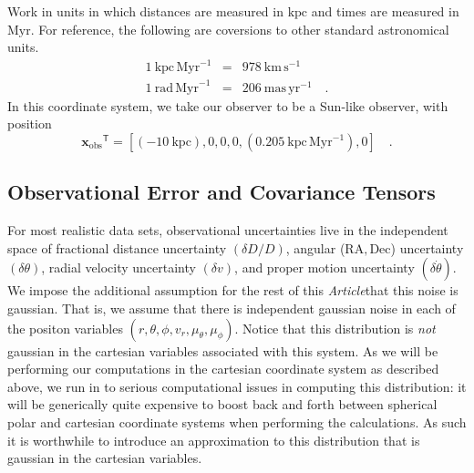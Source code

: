 \documentclass[12pt,preprint]{aastex}
\theoremstyle{plain}
\theoremstyle{definition}
\newcommand{\mtensor}[1]{\boldsymbol{#1}}
\newcommand{\mvector}[1]{\mtensor{#1}}
\newcommand{\vx}{\mvector{x}}
\newcommand{\transpose}[1]{{#1}^{\textsf{T}}}
\newcommand{\unit}[1]{\mathrm{#1}}
\newcommand{\kpc}{\unit{kpc}}
\newcommand{\Myr}{\unit{Myr}}
\newcommand{\kpcpMyr}{\kpc\,\Myr^{-1}}
\newcommand{\km}{\unit{km}}
\newcommand{\s}{\unit{s}}
\newcommand{\kmps}{\km\,\s^{-1}}
\newcommand{\rad}{\unit{rad}}
\newcommand{\radpMyr}{\rad\,\Myr^{-1}}
\newcommand{\mas}{\unit{mas}}
\newcommand{\yr}{\unit{yr}}
\newcommand{\maspyr}{\mas\,\yr^{-1}}
\newcommand{\RA}{\mathrm{RA}}
\newcommand{\Dec}{\mathrm{Dec}}
\newcommand{\vxobs}{\vx_{\mathrm{obs}}}
\newcommand{\documentname}{\textsl{Article}}
\begin{document}
Work in units in which distances are measured in $\kpc$ and times are measured in $\Myr$. For reference, the following are coversions to other standard astronomical units. 
\begin{eqnarray}\displaystyle
1~\kpcpMyr &=& 978~\kmps
\nonumber \\
1~\radpMyr &=& 206~\maspyr
\quad .
\end{eqnarray}
In this coordinate system, we take our observer to be a Sun-like observer, with position 
\begin{equation}
\transpose{\vxobs} = [(-10~\kpc), 0, 0, 0, (0.205~\kpcpMyr), 0]
\quad.
\end{equation}




\subsection{\label{ssec:vartens}Observational Error and Covariance Tensors}
For most realistic data sets, observational uncertainties live in the
independent space of fractional distance uncertainty $(\delta D/D)$,
angular ($\RA, \Dec$) uncertainty $(\delta\theta)$, radial velocity
uncertainty $(\delta v)$, and proper motion uncertainty
$(\delta\dot{\theta})$.  We impose the additional assumption for the rest of this \documentname that this noise is gaussian. That is, we assume that there is independent gaussian noise in each of the positon variables $(r, \theta,\phi, v_r,  \mu_\theta,\mu_\phi)$.  Notice that this distribution is \emph{not} gaussian in the cartesian variables associated with this system. As we will be performing our computations in the cartesian coordinate system as described above, we run in to serious computational issues in computing this distribution: it will be generically quite expensive to boost back and forth between spherical polar and cartesian coordinate systems when performing the calculations. As such it is worthwhile to introduce an approximation to this distribution that is gaussian in the cartesian variables. 
\end{document}
